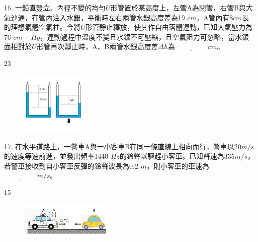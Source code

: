 \documentclass[cn,10pt,math=newtx]{elegantbook}
\begin{document}
\begin{example}
   16. 一鉛直豎立、內徑不變的均勻$U$形管置於某高度上，左管A為閉管，右管B與大氣連通，在管內注入水銀，平衡時左右兩管水銀高度差為19 $cm$，A管內有8$cm$長的理想氣體空氣柱。今將$U$形管靜止釋放，使其作自由落體運動，已知大氣壓力為76 $cm-Hg$，運動過程中溫度不變且水銀不可壓縮，且空氣阻力可忽略，當水銀面相對於$U$形管再次靜止時，A、B兩管水銀高度差$\Delta h$為$\underline{\hspace{2cm}} cm$。\\
    \rightline{[桃園高中教甄109]}
\end{example}
\begin{solution}
    $23$
\end{solution}
\begin{figure}[htbp]
    \flushright
    \includegraphics[width=0.3\textwidth]{image/109桃園16.png}
  \end{figure}
\newpage

\begin{example}
   17. 在水平道路上，一警車A與一小客車B在同一條直線上相向而行，警車以20$m/s$的速度等速前進，並發出頻率1440 $Hz$的鈴聲以驅趕小客車。已知聲速為335$m/s$，若警車接收到自小客車反彈的鈴聲波長為0.2 $m$，則小客車的車速為$\underline{\hspace{2cm}} m/s$。\\
    \rightline{[桃園高中教甄109]}
\end{example}
\begin{solution}
    $15$
\end{solution}
\begin{figure}[htbp]
    \flushright
    \includegraphics[width=0.4\textwidth]{image/109桃園17.png}
  \end{figure}
\newpage
\end{document}
